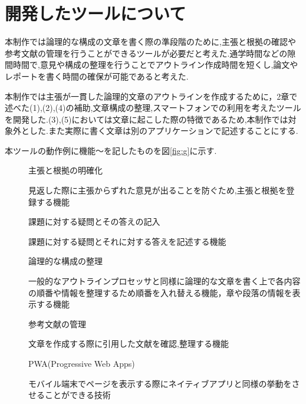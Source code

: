 \documentclass[twocolumn,10pt,a4j]{jsarticle}
\begin{document}
\section{開発したツールについて}
本制作では論理的な構成の文章を書く際の準段階のために,主張と根拠の確認や参考文献の管理を行うことができるツールが必要だと考えた.通学時間などの隙間時間で,意見や構成の整理を行うことでアウトライン作成時間を短くし,論文やレポートを書く時間の確保が可能であると考えた.

本制作では主張が一貫した論理的文章のアウトラインを作成するために，2章で述べた(1),(2),(4)の補助,文章構成の整理,スマートフォンでの利用を考えたツールを開発した.(3),(5)においては文章に起こした際の特徴であるため,本制作では対象外とした.また実際に書く文章は別のアプリケーションで記述することにする.

本ツールの動作例に機能〜を記したものを図\ref{fig:g}に示す.

\begin{comment}
一般的なアウトラインプロセッサと異なり,主張と根拠の明確化や,参考文献を管理することに主眼を置き,アカデミックライティングに沿った文章を作成,スマートフォンでの利用を考え以下の機能を持たせた.
\end{comment}

\begin{description}
  \item[]主張と根拠の明確化
  
 見返した際に主張からずれた意見が出ることを防ぐため,主張と根拠を登録する機能
  
  \item[]課題に対する疑問とその答えの記入
  
課題に対する疑問とそれに対する答えを記述する機能
  
  \item[]論理的な構成の整理
  
  一般的なアウトラインプロセッサと同様に論理的な文章を書く上で各内容の順番や情報を整理するため順番を入れ替える機能，章や段落の情報を表示する機能
  
  \item[]参考文献の管理
  
  文章を作成する際に引用した文献を確認,整理する機能 
  
  \item[]PWA(Progressive Web Apps)
  
  モバイル端末でページを表示する際にネイティブアプリと同様の挙動をさせることができる技術
\end{description}
\end{document}
